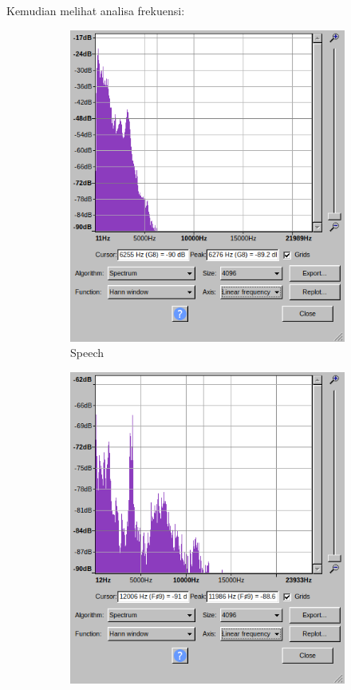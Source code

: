 \documentclass[12pt,]{article}
\begin{document}
	Kemudian melihat analisa frekuensi:
	
	\begin{figure}[!ht]
		\centering
		\begin{subfigure}[b]{0.25\textwidth}
			\includegraphics[width=\textwidth]{images/elitech_testAudioSpeechFreq}
			\caption{Speech}
		\end{subfigure}
		\begin{subfigure}[b]{0.25\textwidth}
			\includegraphics[width=\textwidth]{images/elitech_testAudioWhisperFreq}

\end{subfigure}
\end{figure}
\end{document}
